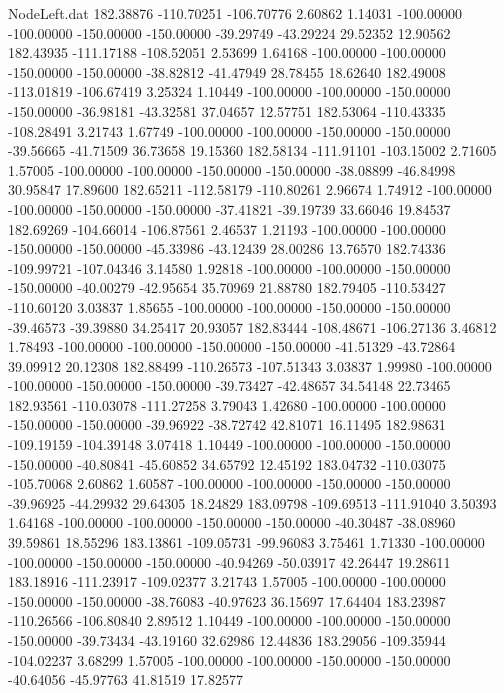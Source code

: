 \begin{filecontents}{NodeLeft.dat}
 182.38876 -110.70251 -106.70776     2.60862    1.14031 -100.00000 -100.00000 -150.00000 -150.00000  -39.29749  -43.29224   29.52352   12.90562
 182.43935 -111.17188 -108.52051     2.53699    1.64168 -100.00000 -100.00000 -150.00000 -150.00000  -38.82812  -41.47949   28.78455   18.62640
 182.49008 -113.01819 -106.67419     3.25324    1.10449 -100.00000 -100.00000 -150.00000 -150.00000  -36.98181  -43.32581   37.04657   12.57751
 182.53064 -110.43335 -108.28491     3.21743    1.67749 -100.00000 -100.00000 -150.00000 -150.00000  -39.56665  -41.71509   36.73658   19.15360
 182.58134 -111.91101 -103.15002     2.71605    1.57005 -100.00000 -100.00000 -150.00000 -150.00000  -38.08899  -46.84998   30.95847   17.89600
 182.65211 -112.58179 -110.80261     2.96674    1.74912 -100.00000 -100.00000 -150.00000 -150.00000  -37.41821  -39.19739   33.66046   19.84537
 182.69269 -104.66014 -106.87561     2.46537    1.21193 -100.00000 -100.00000 -150.00000 -150.00000  -45.33986  -43.12439   28.00286   13.76570
 182.74336 -109.99721 -107.04346     3.14580    1.92818 -100.00000 -100.00000 -150.00000 -150.00000  -40.00279  -42.95654   35.70969   21.88780
 182.79405 -110.53427 -110.60120     3.03837    1.85655 -100.00000 -100.00000 -150.00000 -150.00000  -39.46573  -39.39880   34.25417   20.93057
 182.83444 -108.48671 -106.27136     3.46812    1.78493 -100.00000 -100.00000 -150.00000 -150.00000  -41.51329  -43.72864   39.09912   20.12308
 182.88499 -110.26573 -107.51343     3.03837    1.99980 -100.00000 -100.00000 -150.00000 -150.00000  -39.73427  -42.48657   34.54148   22.73465
 182.93561 -110.03078 -111.27258     3.79043    1.42680 -100.00000 -100.00000 -150.00000 -150.00000  -39.96922  -38.72742   42.81071   16.11495
 182.98631 -109.19159 -104.39148     3.07418    1.10449 -100.00000 -100.00000 -150.00000 -150.00000  -40.80841  -45.60852   34.65792   12.45192
 183.04732 -110.03075 -105.70068     2.60862    1.60587 -100.00000 -100.00000 -150.00000 -150.00000  -39.96925  -44.29932   29.64305   18.24829
 183.09798 -109.69513 -111.91040     3.50393    1.64168 -100.00000 -100.00000 -150.00000 -150.00000  -40.30487  -38.08960   39.59861   18.55296
 183.13861 -109.05731  -99.96083     3.75461    1.71330 -100.00000 -100.00000 -150.00000 -150.00000  -40.94269  -50.03917   42.26447   19.28611
 183.18916 -111.23917 -109.02377     3.21743    1.57005 -100.00000 -100.00000 -150.00000 -150.00000  -38.76083  -40.97623   36.15697   17.64404
 183.23987 -110.26566 -106.80840     2.89512    1.10449 -100.00000 -100.00000 -150.00000 -150.00000  -39.73434  -43.19160   32.62986   12.44836
 183.29056 -109.35944 -104.02237     3.68299    1.57005 -100.00000 -100.00000 -150.00000 -150.00000  -40.64056  -45.97763   41.81519   17.82577

\end{filecontents}
